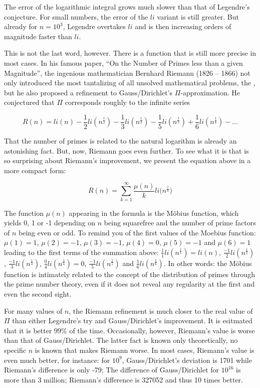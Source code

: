 \documentclass{scrreprt}
\begin{document}
The error of the logarithmic integral grows much slower
than that of Legendre's conjecture.
For small numbers, the error of the $li$ variant
is still greater. But already for $n = 10^3$, 
Legendre overtakes $li$ and is then increasing orders
of magnitude faster than $li$.

This is not the last word, however.
There is a function that is still more precise
in most cases.
In his famous paper, 
``On the Number of Primes less than a given Magnitude'',
the ingenious mathematician Bernhard Riemann (1826 -- 1866)
not only introduced the most tantalizing of all
unsolved mathematical problems,
the ,
but he also proposed a refinement to Gauss/Dirichlet's 
$\Pi$-approximation. He conjectured that $\Pi$ 
corresponds roughly to the infinite series

\begin{equation}
R(n) = li(n) - \frac{1}{2} li(n^{\frac{1}{2}})
             - \frac{1}{3} li(n^{\frac{1}{3}})
             - \frac{1}{5} li(n^{\frac{1}{5}})
             + \frac{1}{6} li(n^{\frac{1}{6}})
             - \dots
\end{equation}

That the number of primes is related to the natural logarithm
is already an astonishing fact.
But, now, Riemann goes even further.
To see what it is that is so surprising 
about Riemann's improvement, we present the equation above
in a more compact form:

\begin{equation}
R(n) = \sum_{k=1}^{\infty}{\frac{\mu(n)}{k}li(n^{\frac{1}{k}}})
\end{equation}

The function $\mu(n)$ appearing in the formula
is the Möbius function, which yields 0, 1 or -1
depending on $n$ being squarefree and 
the number of prime factors of $n$ being
even or odd.
To remind you of the first values 
of the Moebius function:
$\mu(1) = 1$, $\mu(2) = -1$, $\mu(3) = -1$,
$\mu(4) = 0$, $\mu(5) = -1$ and $\mu(6) = 1$
leading to the first terms of the summation above:
$\frac{1}{1}li(n^{\frac{1}{1}}) = li(n)$, 
$\frac{-1}{2}li(n^{\frac{1}{2}})$,
$\frac{-1}{3}li(n^{\frac{1}{3}})$,
$\frac{0}{4}li(n^{\frac{1}{4}}) = 0$,
$\frac{-1}{5}li(n^{\frac{1}{5}})$ and
$\frac{1}{6}li(n^{\frac{1}{6}})$.
In other words:
the Möbius function is intimately related
to the concept of the distribution of primes
through the prime number theory,
even if it does not reveal any regularity 
at the first and even the second sight.

For many values of $n$, the Riemann refinement
is much closer to the real value of $\Pi$
than either Legendre's try and Gauss/Dirichlet's
improvement. It is esitmated that it is better
99\% of the time. Occasionally, however,
Riemann's value is worse than that of Gauss/Dirichlet.
The latter fact is known only theoretically,
no specific $n$ is known that makes Riemann
worse. In most cases, Riemann's value
is even much better, for instance:
for $10^9$, Gauss/Dirichlet's deviation is
1701 while Riemann's difference is only -79;
The difference of Gauss/Dirichlet for $10^{16}$
is more than 3 million; Riemann's difference is
\num{327052} and thus 10 times better.
\end{document}
